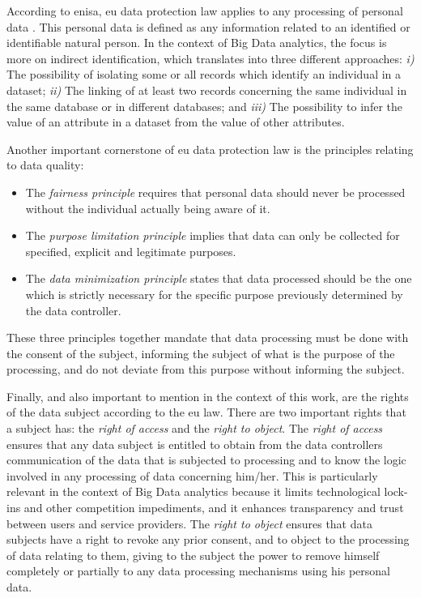  According to \ac{enisa}, \ac{eu} data protection law applies to any processing of personal data \cite{DAcquisto2015}. This personal data is defined as any information related to an identified or identifiable natural person. In the context of Big Data analytics, the focus is more on indirect identification, which translates into three different approaches: \emph{i)} The possibility of isolating some or all records which identify an individual in a dataset; \emph{ii)} The linking of at least two records concerning the same individual in the same database or in different databases; and  \emph{iii)} The possibility to infer the value of an attribute in a dataset from the value of other attributes.



Another important cornerstone of \ac{eu} data protection law is the principles relating to data quality:

\begin{itemize}

    \item The \textit{fairness principle} requires that personal data should never be processed without the individual actually being aware of it.

    \item The \textit{purpose limitation principle} implies that data can only be collected for specified, explicit and legitimate purposes.

    \item The \textit{data minimization principle} states that data processed should be the one which is strictly necessary for the specific purpose previously determined by the data controller.
\end{itemize}


These three principles together mandate that data processing must be done with the consent of the subject, informing the subject of what is the purpose of the processing, and do not deviate from this purpose without informing the subject.

Finally, and also important to mention in the context of this work, are the rights of the data subject according to the \ac{eu} law. There are two important rights that a subject has: the \textit{right of access} and the \textit{right to object}.
The \textit{right of access} ensures that any data subject is entitled to obtain from the data controllers communication of the data that is subjected to processing and to know the logic involved in any processing of data concerning him/her.
This is particularly relevant in the context of Big Data analytics because it limits technological lock-ins and other competition impediments, and it enhances transparency and trust between users and service providers.
The \textit{right to object} ensures that data subjects have a right to revoke any prior consent, and to object to the processing of data relating to them, giving to the subject the power to remove himself completely or partially to any data processing mechanisms using his personal data.



